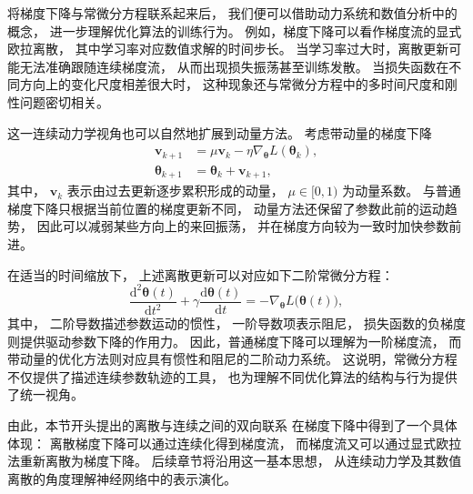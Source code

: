 \documentclass[UTF8,a4paper,zihao=-4,oneside,openany]{ctexbook}
\begin{document}
将梯度下降与常微分方程联系起来后，
我们便可以借助动力系统和数值分析中的概念，
进一步理解优化算法的训练行为。
例如，梯度下降可以看作梯度流的显式欧拉离散，
其中学习率对应数值求解的时间步长。
当学习率过大时，离散更新可能无法准确跟随连续梯度流，
从而出现损失振荡甚至训练发散。
当损失函数在不同方向上的变化尺度相差很大时，
这种现象还与常微分方程中的多时间尺度和刚性问题密切相关。

这一连续动力学视角也可以自然地扩展到动量方法。
考虑带动量的梯度下降
\begin{align}
    \boldsymbol{v}_{k+1}
    &=
    \mu\boldsymbol{v}_{k}
    -
    \eta
    \nabla_{\boldsymbol{\theta}}
    L(\boldsymbol{\theta}_{k}),
    \label{eq:momentum-velocity}
    \\
    \boldsymbol{\theta}_{k+1}
    &=
    \boldsymbol{\theta}_{k}
    +
    \boldsymbol{v}_{k+1},
    \label{eq:momentum-update}
\end{align}
其中，
\(\boldsymbol{v}_{k}\)
表示由过去更新逐步累积形成的动量，
\(\mu\in[0,1)\)
为动量系数。
与普通梯度下降只根据当前位置的梯度更新不同，
动量方法还保留了参数此前的运动趋势，
因此可以减弱某些方向上的来回振荡，
并在梯度方向较为一致时加快参数前进。

在适当的时间缩放下，
上述离散更新可以对应如下二阶常微分方程：
\begin{equation}
    \frac{\mathrm{d}^{2}\boldsymbol{\theta}(t)}
    {\mathrm{d}t^{2}}
    +
    \gamma
    \frac{\mathrm{d}\boldsymbol{\theta}(t)}
    {\mathrm{d}t}
    =
    -
    \nabla_{\boldsymbol{\theta}}
    L\bigl(\boldsymbol{\theta}(t)\bigr),
    \label{eq:heavy-ball-ode}
\end{equation}
其中，
二阶导数描述参数运动的惯性，
一阶导数项表示阻尼，
损失函数的负梯度则提供驱动参数下降的作用力。
因此，普通梯度下降可以理解为一阶梯度流，
而带动量的优化方法则对应具有惯性和阻尼的二阶动力系统。
这说明，常微分方程不仅提供了描述连续参数轨迹的工具，
也为理解不同优化算法的结构与行为提供了统一视角。



由此，本节开头提出的离散与连续之间的双向联系
在梯度下降中得到了一个具体体现：
离散梯度下降可以通过连续化得到梯度流，
而梯度流又可以通过显式欧拉法重新离散为梯度下降。
后续章节将沿用这一基本思想，
从连续动力学及其数值离散的角度理解神经网络中的表示演化。
\end{document}
